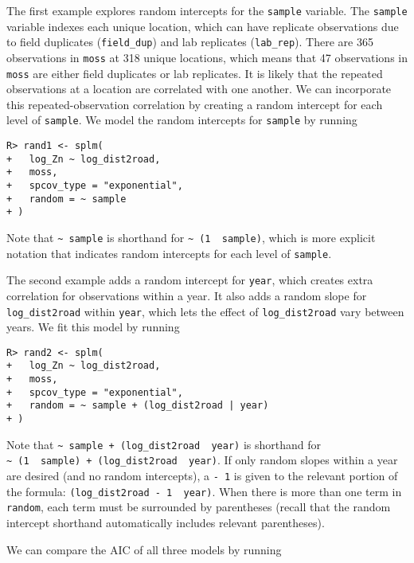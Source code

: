 \documentclass[10pt,letterpaper]{article}
\begin{document}
The first example explores random intercepts for the \texttt{sample}
variable. The \texttt{sample} variable indexes each unique location,
which can have replicate observations due to field duplicates
(\texttt{field\_dup}) and lab replicates (\texttt{lab\_rep}). There are
365 observations in \texttt{moss} at 318 unique locations, which means
that 47 observations in \texttt{moss} are either field duplicates or lab
replicates. It is likely that the repeated observations at a location
are correlated with one another. We can incorporate this
repeated-observation correlation by creating a random intercept for each
level of \texttt{sample}. We model the random intercepts for
\texttt{sample} by running

\begin{verbatim}
R> rand1 <- splm(
+   log_Zn ~ log_dist2road,
+   moss,
+   spcov_type = "exponential",
+   random = ~ sample
+ )
\end{verbatim}

\noindent Note that \texttt{\textasciitilde{}\ sample} is shorthand for
\texttt{\textasciitilde{}\ (1\ \textbar{}\ sample)}, which is more
explicit notation that indicates random intercepts for each level of
\texttt{sample}.

The second example adds a random intercept for \texttt{year}, which
creates extra correlation for observations within a year. It also adds a
random slope for \texttt{log\_dist2road} within \texttt{year}, which
lets the effect of \texttt{log\_dist2road} vary between years. We fit
this model by running

\begin{verbatim}
R> rand2 <- splm(
+   log_Zn ~ log_dist2road,
+   moss,
+   spcov_type = "exponential",
+   random = ~ sample + (log_dist2road | year)
+ )
\end{verbatim}

\noindent Note that
\texttt{\textasciitilde{}\ sample\ +\ (log\_dist2road\ \textbar{}\ year)}
is shorthand for
\texttt{\textasciitilde{}\ (1\ \textbar{}\ sample)\ +\ (log\_dist2road\ \textbar{}\ year)}.
If only random slopes within a year are desired (and no random
intercepts), a \texttt{-\ 1} is given to the relevant portion of the
formula: \texttt{(log\_dist2road\ -\ 1\ \textbar{}\ year)}. When there
is more than one term in \texttt{random}, each term must be surrounded
by parentheses (recall that the random intercept shorthand automatically
includes relevant parentheses).

We can compare the AIC of all three models by running
\end{document}
